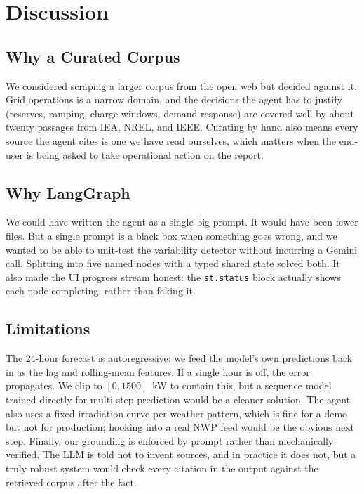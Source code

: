 \documentclass[journal,onecolumn,11pt]{IEEEtran}
\begin{document}
\section{Discussion}

\subsection{Why a Curated Corpus}
We considered scraping a larger corpus from the open web but decided against it. Grid operations is a narrow domain, and the decisions the agent has to justify (reserves, ramping, charge windows, demand response) are covered well by about twenty passages from IEA, NREL, and IEEE. Curating by hand also means every source the agent cites is one we have read ourselves, which matters when the end-user is being asked to take operational action on the report.

\subsection{Why LangGraph}
We could have written the agent as a single big prompt. It would have been fewer files. But a single prompt is a black box when something goes wrong, and we wanted to be able to unit-test the variability detector without incurring a Gemini call. Splitting into five named nodes with a typed shared state solved both. It also made the UI progress stream honest: the \texttt{st.status} block actually shows each node completing, rather than faking it.

\subsection{Limitations}
The 24-hour forecast is autoregressive: we feed the model's own predictions back in as the lag and rolling-mean features. If a single hour is off, the error propagates. We clip to $[0, 1500]$~kW to contain this, but a sequence model trained directly for multi-step prediction would be a cleaner solution. The agent also uses a fixed irradiation curve per weather pattern, which is fine for a demo but not for production; hooking into a real NWP feed would be the obvious next step. Finally, our grounding is enforced by prompt rather than mechanically verified. The LLM is told not to invent sources, and in practice it does not, but a truly robust system would check every citation in the output against the retrieved corpus after the fact.

\end{document}
